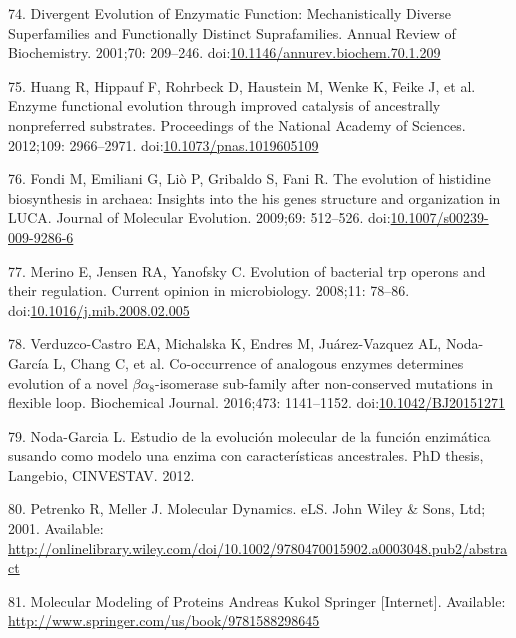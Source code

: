 \documentclass[12pt,twoside]{reedthesis}
\begin{document}
  \hypertarget{ref-gerltux5fdivergentux5f2001}{}
  74. Divergent Evolution of Enzymatic Function: Mechanistically Diverse
  Superfamilies and Functionally Distinct Suprafamilies. Annual Review of
  Biochemistry. 2001;70: 209--246.
  doi:\href{https://doi.org/10.1146/annurev.biochem.70.1.209}{10.1146/annurev.biochem.70.1.209}
  
  \hypertarget{ref-huangux5fenzymeux5f2012}{}
  75. Huang R, Hippauf F, Rohrbeck D, Haustein M, Wenke K, Feike J, et al.
  Enzyme functional evolution through improved catalysis of ancestrally
  nonpreferred substrates. Proceedings of the National Academy of
  Sciences. 2012;109: 2966--2971.
  doi:\href{https://doi.org/10.1073/pnas.1019605109}{10.1073/pnas.1019605109}
  
  \hypertarget{ref-fondiux5fevolutionux5f2009}{}
  76. Fondi M, Emiliani G, Liò P, Gribaldo S, Fani R. The evolution of
  histidine biosynthesis in archaea: Insights into the his genes structure
  and organization in LUCA. Journal of Molecular Evolution. 2009;69:
  512--526.
  doi:\href{https://doi.org/10.1007/s00239-009-9286-6}{10.1007/s00239-009-9286-6}
  
  \hypertarget{ref-merinoux5fevolutionux5f2008}{}
  77. Merino E, Jensen RA, Yanofsky C. Evolution of bacterial trp operons
  and their regulation. Current opinion in microbiology. 2008;11: 78--86.
  doi:\href{https://doi.org/10.1016/j.mib.2008.02.005}{10.1016/j.mib.2008.02.005}
  
  \hypertarget{ref-verduzco-castroux5fco-occurrenceux5f2016}{}
  78. Verduzco-Castro EA, Michalska K, Endres M, Juárez-Vazquez AL,
  Noda-García L, Chang C, et al. Co-occurrence of analogous enzymes
  determines evolution of a novel \(\beta\alpha_8\)-isomerase sub-family
  after non-conserved mutations in flexible loop. Biochemical Journal.
  2016;473: 1141--1152.
  doi:\href{https://doi.org/10.1042/BJ20151271}{10.1042/BJ20151271}
  
  \hypertarget{ref-nodaux5festudioux5f2012}{}
  79. Noda-Garcia L. Estudio de la evolución molecular de la función
  enzimática susando como modelo una enzima con características
  ancestrales. PhD thesis, Langebio, CINVESTAV. 2012.
  
  \hypertarget{ref-petrenkoux5fmolecularux5f2001}{}
  80. Petrenko R, Meller J. Molecular Dynamics. eLS. John Wiley \& Sons,
  Ltd; 2001. Available:
  \url{http://onlinelibrary.wiley.com/doi/10.1002/9780470015902.a0003048.pub2/abstract}
  
  \hypertarget{ref-kukolux5fmolecularux5f2008}{}
  81. Molecular Modeling of Proteins Andreas Kukol Springer
  {[}Internet{]}. Available:
  \url{http://www.springer.com/us/book/9781588298645}
  
\end{document}
